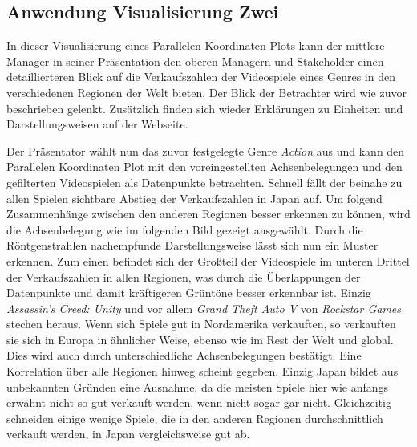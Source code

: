 \documentclass[usegeometry=true]{scrartcl}
\begin{document}
\subsection{Anwendung Visualisierung Zwei}
In dieser Visualisierung eines Parallelen Koordinaten Plots kann der mittlere Manager in seiner Präsentation den oberen Managern und Stakeholder einen detaillierteren Blick auf die Verkaufszahlen der Videospiele eines Genres in den verschiedenen Regionen der Welt bieten.
Der Blick der Betrachter wird wie zuvor beschrieben gelenkt.
Zusätzlich finden sich wieder Erklärungen zu Einheiten und Darstellungsweisen auf der Webseite.

Der Präsentator wählt nun das zuvor festgelegte Genre \textit{Action} aus und kann den Parallelen Koordinaten Plot mit den voreingestellten Achsenbelegungen und den gefilterten Videospielen als Datenpunkte betrachten. 
Schnell fällt der beinahe zu allen Spielen sichtbare Abstieg der Verkaufszahlen in Japan auf. 
Um folgend Zusammenhänge zwischen den anderen Regionen besser erkennen zu können, wird die Achsenbelegung wie im folgenden Bild gezeigt ausgewählt.
Durch die Röntgenstrahlen nachempfunde Darstellungsweise lässt sich nun ein Muster erkennen. 
Zum einen befindet sich der Großteil der Videospiele im unteren Drittel der Verkaufszahlen in allen Regionen, was durch die Überlappungen der Datenpunkte und damit kräftigeren Grüntöne besser erkennbar ist.
Einzig \textit{Assassin's Creed: Unity} und vor allem \textit{Grand Theft Auto V} von \textit{Rockstar Games} stechen heraus. 
Wenn sich Spiele gut in Nordamerika verkauften, so verkauften sie sich in Europa in ähnlicher Weise, ebenso wie im Rest der Welt und global.
Dies wird auch durch unterschiedliche Achsenbelegungen bestätigt. Eine Korrelation über alle Regionen hinweg scheint gegeben. 
Einzig Japan bildet aus unbekannten Gründen eine Ausnahme, da die meisten Spiele hier wie anfangs erwähnt nicht so gut verkauft werden, wenn nicht sogar gar nicht. 
Gleichzeitig schneiden einige wenige Spiele, die in den anderen Regionen durchschnittlich verkauft werden, in Japan vergleichsweise gut ab. 
\end{document}

